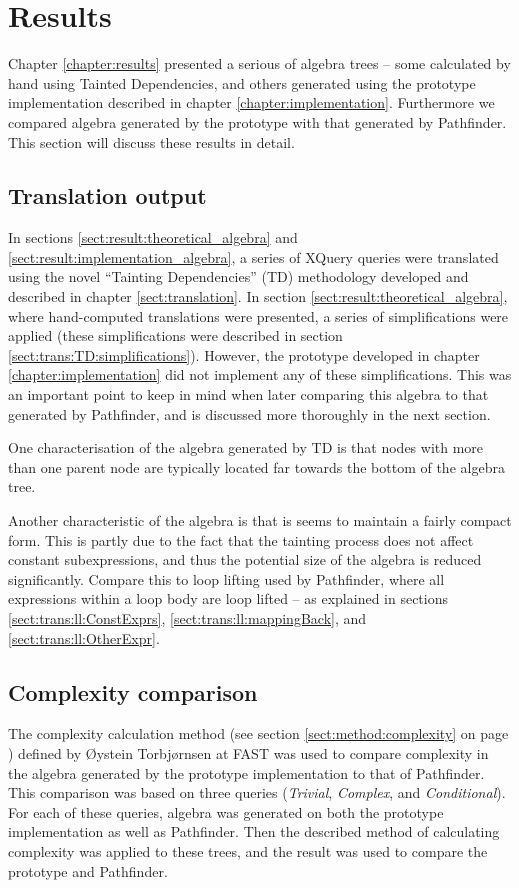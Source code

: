 \section{Results}
\label{sect:disc:res}
Chapter \ref{chapter:results} presented a serious of algebra trees --
some calculated by hand using Tainted Dependencies, and others generated using
the prototype implementation described in chapter \ref{chapter:implementation}.
Furthermore we compared algebra generated by the prototype with that generated
by Pathfinder. This section will discuss these results in detail.

\subsection{Translation output}
\label{sect:disc:res:translation_output}
In sections \ref{sect:result:theoretical_algebra} and
\ref{sect:result:implementation_algebra}, a series of XQuery queries were
translated using the novel ``Tainting Dependencies'' (TD) methodology developed
and described in chapter \ref{sect:translation}. In section
\ref{sect:result:theoretical_algebra}, where hand-computed translations were
presented, a series of simplifications were applied (these simplifications were
described in section \ref{sect:trans:TD:simplifications}). However, the
prototype developed in chapter \ref{chapter:implementation} did not implement
any of these simplifications. This was an important point to keep in mind when
later comparing this algebra to that generated by Pathfinder, and is
discussed more thoroughly in the next section.

One characterisation of the algebra generated by TD is that nodes with more
than one parent node are typically located far towards the bottom of the algebra
tree. 

Another characteristic of the algebra is that is seems to maintain a fairly
compact form. This is partly due to the fact that the tainting process does not
affect constant subexpressions, and thus the potential size of the algebra is
reduced significantly. Compare this to loop lifting used by
Pathfinder, where all expressions within a loop body are loop lifted --
as explained in sections \ref{sect:trans:ll:ConstExprs},
\ref{sect:trans:ll:mappingBack}, and \ref{sect:trans:ll:OtherExpr}.

\subsection{Complexity comparison}
\label{sect:disc:res:comparison}
The complexity calculation method (see section \ref{sect:method:complexity} on
page \pageref{sect:method:complexity}) defined by \O ystein Torbj\o rnsen at
FAST was used to compare complexity in the algebra generated by the prototype
implementation to that of Pathfinder. This comparison was
based on three queries (\emph{Trivial}, \emph{Complex}, and
\emph{Conditional}). For each of these queries, algebra was generated on both
the prototype implementation as well as Pathfinder. Then the described
method of calculating complexity was applied to these trees, and the result was
used to compare the prototype and Pathfinder.

